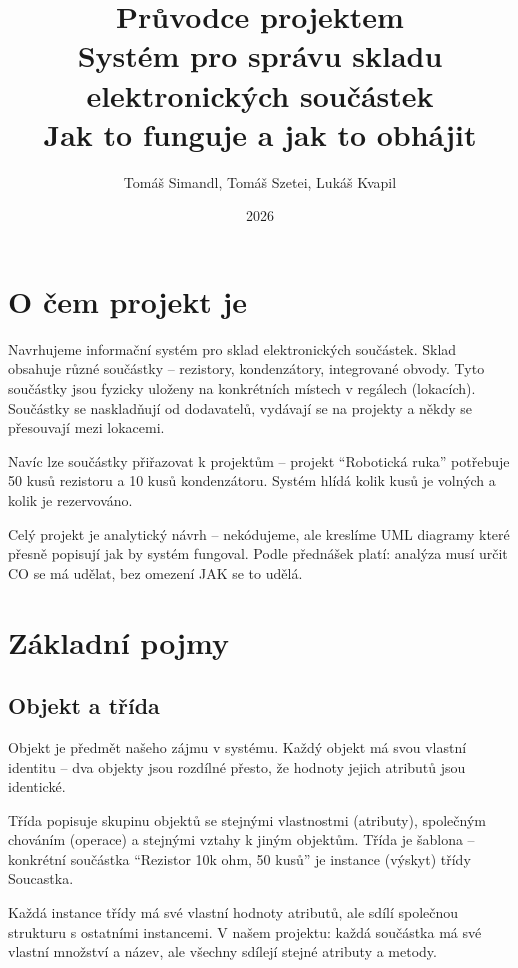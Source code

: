 \documentclass[12pt, a4paper]{article}
\title{\textbf{Průvodce projektem}\\[0.5em]
\large Systém pro správu skladu elektronických součástek\\[0.3em]
\normalsize Jak to funguje a jak to obhájit}
\author{Tomáš Simandl, Tomáš Szetei, Lukáš Kvapil}
\date{2026}
\begin{document}
\maketitle
\thispagestyle{empty}
\tableofcontents
\newpage

\section{O čem projekt je}

Navrhujeme informační systém pro sklad elektronických součástek. Sklad obsahuje různé součástky -- rezistory, kondenzátory, integrované obvody. Tyto součástky jsou fyzicky uloženy na konkrétních místech v regálech (lokacích). Součástky se naskladňují od dodavatelů, vydávají se na projekty a někdy se přesouvají mezi lokacemi.

Navíc lze součástky přiřazovat k projektům -- projekt ``Robotická ruka'' potřebuje 50 kusů rezistoru a 10 kusů kondenzátoru. Systém hlídá kolik kusů je volných a kolik je rezervováno.

Celý projekt je analytický návrh -- nekódujeme, ale kreslíme UML diagramy které přesně popisují jak by systém fungoval. Podle přednášek platí: analýza musí určit CO se má udělat, bez omezení JAK se to udělá.

\section{Základní pojmy}

\subsection{Objekt a třída}

Objekt je předmět našeho zájmu v systému. Každý objekt má svou vlastní identitu -- dva objekty jsou rozdílné přesto, že hodnoty jejich atributů jsou identické.

Třída popisuje skupinu objektů se stejnými vlastnostmi (atributy), společným chováním (operace) a stejnými vztahy k jiným objektům. Třída je šablona -- konkrétní součástka ``Rezistor 10k ohm, 50 kusů'' je instance (výskyt) třídy Soucastka.

Každá instance třídy má své vlastní hodnoty atributů, ale sdílí společnou strukturu s ostatními instancemi. V našem projektu: každá součástka má své vlastní množství a název, ale všechny sdílejí stejné atributy a metody.
\end{document}
